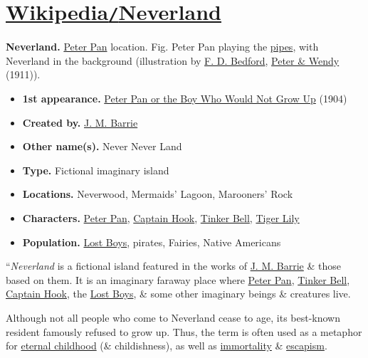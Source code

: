 \documentclass[oneside]{book}
\numberwithin{equation}{section}
\begin{document}
\section{\href{https://en.wikipedia.org/wiki/Neverland}{Wikipedia\texttt{/}Neverland}}
\textbf{Neverland.} \href{https://en.wikipedia.org/wiki/Peter_and_Wendy}{Peter Pan} location. \textsf{Fig. Peter Pan playing the \href{https://en.wikipedia.org/wiki/Pan_flute}{pipes}, with Neverland in the background (illustration by \href{https://en.wikipedia.org/wiki/Francis_Donkin_Bedford}{F. D. Bedford}, \href{https://en.wikipedia.org/wiki/Peter_and_Wendy}{Peter \& Wendy} (1911)).}
\begin{itemize}
	\item \textbf{1st appearance.} \href{https://en.wikipedia.org/wiki/Peter_and_Wendy}{Peter Pan or the Boy Who Would Not Grow Up} (1904)
	\item \textbf{Created by.} \href{https://en.wikipedia.org/wiki/J._M._Barrie}{J. M. Barrie}
	\item \textbf{Other name(s).} Never Never Land
	\item \textbf{Type.} Fictional imaginary island
	\item \textbf{Locations.} Neverwood, Mermaids' Lagoon, Marooners' Rock
	\item \textbf{Characters.} \href{https://en.wikipedia.org/wiki/Peter_Pan}{Peter Pan}, \href{https://en.wikipedia.org/wiki/Captain_Hook}{Captain Hook}, \href{https://en.wikipedia.org/wiki/Tinker_Bell}{Tinker Bell}, \href{https://en.wikipedia.org/wiki/Tiger_Lily_(Peter_Pan)}{Tiger Lily}
	\item \textbf{Population.} \href{https://en.wikipedia.org/wiki/Lost_Boys_(Peter_Pan)}{Lost Boys}, pirates, Fairies, Native Americans
\end{itemize}
``\textit{Neverland} is a fictional island featured in the works of \href{https://en.wikipedia.org/wiki/J._M._Barrie}{J. M. Barrie} \& those based on them. It is an imaginary faraway place where \href{https://en.wikipedia.org/wiki/Peter_Pan}{Peter Pan}, \href{https://en.wikipedia.org/wiki/Tinker_Bell}{Tinker Bell}, \href{https://en.wikipedia.org/wiki/Captain_Hook}{Captain Hook}, the \href{https://en.wikipedia.org/wiki/Lost_Boys_(Peter_Pan)}{Lost Boys}, \& some other imaginary beings \& creatures live.

Although not all people who come to Neverland cease to age, its best-known resident famously refused to grow up. Thus, the term is often used as a metaphor for \href{https://en.wikipedia.org/wiki/Peter_Pan_syndrome}{eternal childhood} (\& childishness), as well as \href{https://en.wikipedia.org/wiki/Immortality}{immortality} \& \href{https://en.wikipedia.org/wiki/Escapism}{escapism}.
\end{document}
